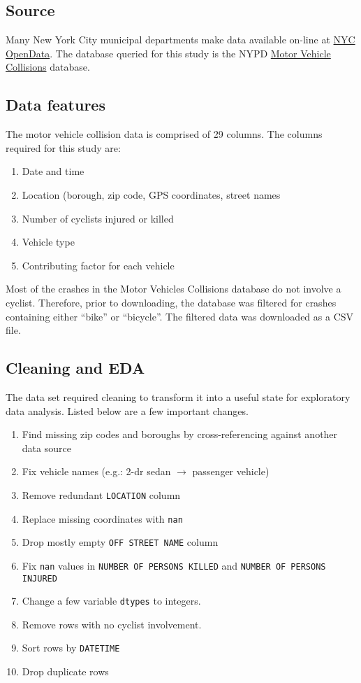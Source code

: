 \documentclass[twocolumn,oneside]{article}
\begin{document}
\subsection{Source}

Many New York City municipal departments make data available on-line
at \href{https://opendata.cityofnewyork.us/}{NYC OpenData}.  The
database queried for this study is the NYPD
\href{https://data.cityofnewyork.us/Public-Safety/Motor-Vehicle-Collisions-Crashes/h9gi-nx95}{Motor
  Vehicle Collisions} database.

\subsection{Data features}

The motor vehicle collision data is comprised of 29 columns.  The
columns required for this study are:

\begin{enumerate}
\item Date and time
\item Location (borough, zip code, GPS coordinates, street names
\item Number of cyclists injured or killed
\item Vehicle type
\item Contributing factor for each vehicle
\end{enumerate}

Most of the crashes in the Motor Vehicles Collisions database do not
involve a cyclist.  Therefore, prior to downloading, the database was
filtered for crashes containing either ``bike'' or ``bicycle''.  The
filtered data was downloaded as a CSV file.

\subsection{Cleaning and EDA}
The data set required cleaning to transform it into a useful state for
exploratory data analysis.  Listed below are a few important changes.

\begin{enumerate}
\item Find missing zip codes and boroughs by cross-referencing against
  another data source
\item Fix vehicle names (e.g.: 2-dr sedan $\rightarrow$ passenger
  vehicle)
\item Remove redundant \verb+LOCATION+ column
\item Replace missing coordinates with \verb+nan+
\item Drop mostly empty \verb+OFF STREET NAME+ column
\item Fix \verb+nan+ values in \verb+NUMBER OF PERSONS KILLED+ and
  \verb+NUMBER OF PERSONS INJURED+
\item Change a few variable \verb+dtypes+ to integers.
\item Remove rows with no cyclist involvement.
\item Sort rows by \verb+DATETIME+
\item Drop duplicate rows
    
\end{enumerate}
  
\end{document}
